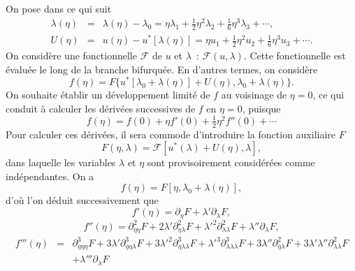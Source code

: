 \documentclass{article}
\begin{document}
On pose dans ce qui suit
\begin{eqnarray}
  λ (\eta) & = & λ (\eta) - λ_0 = \eta λ_1 +
  \tfrac{1}{2} \eta^2 λ_2 + \tfrac{1}{6} \eta^3 λ_3 + \cdots,
  \label{eq20211112155446}\\
  U (\eta) & = & u (\eta) - u^{\ast} [λ (\eta)] = \eta u_1 +
  \tfrac{1}{2} \eta^2 u_2 + \tfrac{1}{6} \eta^3 u_3 + \cdots .
  \label{eq20211112113028}
\end{eqnarray}
On considère une fonctionnelle $\mathcal{F}$ de $u$ et $λ$~:
$\mathcal{F} (u, λ)$. Cette fonctionnelle est évaluée le long de
la branche bifurquée. En d'autres termes, on considère
\begin{equation}
  f (\eta) = F \{ u^{\ast} [λ_0 + λ (\eta)] + U (\eta), λ_0
  + λ (\eta) \} .
\end{equation}
On souhaite établir un développement limité de $f$ au voisinage de
$\eta = 0$, ce qui conduit à calculer les dérivées successives de
$f$ en $\eta = 0$, puisque
\begin{equation}
  f (\eta) = f (0) + \eta f' (0) + \tfrac{1}{2} \eta^2 f'' (0) + \cdots
\end{equation}
Pour calculer ces dérivées, il sera commode d'introduire la fonction
auxiliaire $F$
\begin{equation}
  F (\eta, λ) =\mathcal{F} [u^{\ast} (λ) + U (\eta), λ],
\end{equation}
dans laquelle les variables $λ$ et $\eta$ sont provisoirement
considérées comme indépendantes. On a
\begin{equation}
  f (\eta) = F [\eta, λ_0 + λ (\eta)],
\end{equation}
d'où l'on déduit successivement que
\begin{equation}
  \label{eq20211112162417} f' (\eta) = \partial_{\eta} F + λ'
  \partial_{λ} F,
\end{equation}
\begin{equation}
  \label{eq20211112165810} f'' (\eta) = \partial_{\eta  \eta}^2 F + 2
  λ' \partial_{\eta  λ}^2 {F + λ'}^2
  \partial_{λ  λ}^2 F + λ'' \partial_{λ} F,
\end{equation}
\begin{eqnarray}
  \label{eq20211112173223} f''' (\eta) & = & \partial_{\eta  \eta
   \eta}^3 F + 3 λ' \partial_{\eta  \eta
  λ}^3 {F + 3 λ'}^2 \partial_{\eta  λ
  λ}^3 {F + λ'}^3 \partial_{λ  λ
  λ}^3 F + 3 λ'' \partial_{\eta  λ}^2 F + 3 λ'
  λ'' \partial_{λ  λ}^2 F \nonumber\\
  &  &  + λ''' \partial_{λ} F
\end{eqnarray}
\end{document}
